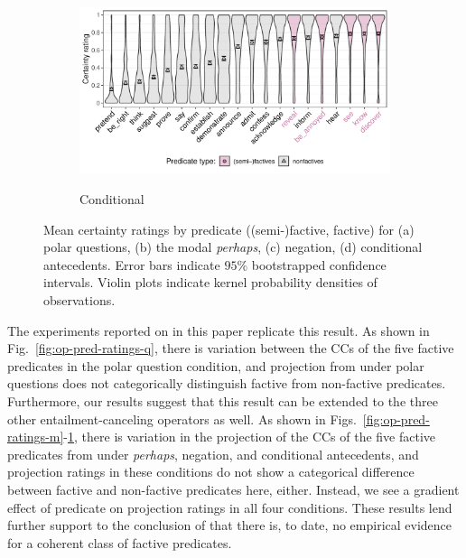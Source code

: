 \documentclass[a4paper,12pt,twoside]{article}
\begin{document}
\begin{figure}[h!]
            \vspace{-\baselineskip}
            \begin{subfigure}[t]{0.57\textwidth}
            \caption{Conditional}
            \includegraphics[width = 1\linewidth]{conditional-predicate-graph.pdf}
            \label{fig:op-pred-ratings-c}
            \end{subfigure}

            \vspace{-\baselineskip}
            \caption{Mean certainty ratings by predicate (\textcolor{pred-fcv-color}{(semi-)factive}, factive) for (a) polar questions, (b) the modal \emph{perhaps}, (c) negation, (d) conditional antecedents. Error bars indicate $95\%$ bootstrapped confidence intervals. Violin plots indicate kernel probability densities of observations.}\label{fig:op-pred-ratings2}
        \end{figure}

        The experiments reported on in this paper replicate this result. As shown in Fig.~\ref{fig:op-pred-ratings-q}, there is variation between the CCs of the five factive predicates in the polar question condition, and projection from under polar questions does not categorically distinguish factive from non-factive predicates. Furthermore, our results suggest that this result can be extended to the three other entailment-canceling operators as well. As shown in Figs.~\ref{fig:op-pred-ratings-m}-\ref{fig:op-pred-ratings-c}, there is variation in the projection of the CCs of the five factive predicates from under \emph{perhaps}, negation, and conditional antecedents, and projection ratings in these conditions do not show a categorical difference between factive and non-factive predicates here, either. Instead, we see a gradient  effect of predicate on projection ratings in all four conditions. These results lend further support to the conclusion of \citealt{degen_are_2022} that there is, to date, no empirical evidence for a coherent class of factive predicates.
\end{document}
